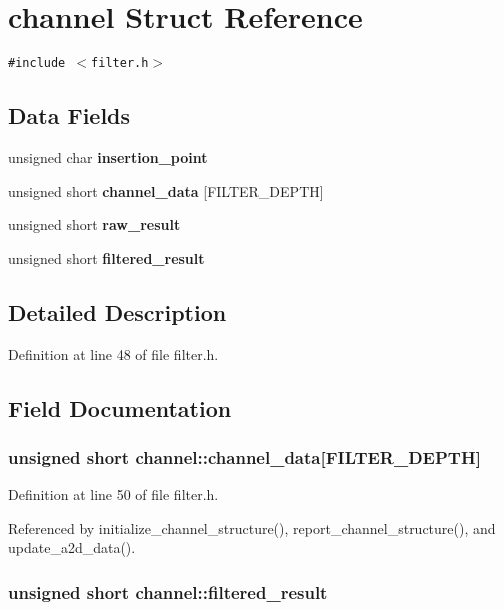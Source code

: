 \section{channel Struct Reference}
\label{structchannel}
{\tt \#include $<$filter.h$>$}

\subsection*{Data Fields}
\begin{CompactItemize}
\item 
unsigned char {\bf insertion\_\-point}
\item 
unsigned short {\bf channel\_\-data} [FILTER\_\-DEPTH]
\item 
unsigned short {\bf raw\_\-result}
\item 
unsigned short {\bf filtered\_\-result}
\end{CompactItemize}


\subsection{Detailed Description}




Definition at line 48 of file filter.h.

\subsection{Field Documentation}
\subsubsection{\setlength{\rightskip}{0pt plus 5cm}unsigned short {\bf channel::channel\_\-data}[FILTER\_\-DEPTH]}\label{structchannel_o1}




Definition at line 50 of file filter.h.

Referenced by initialize\_\-channel\_\-structure(), report\_\-channel\_\-structure(), and update\_\-a2d\_\-data().
\subsubsection{\setlength{\rightskip}{0pt plus 5cm}unsigned short {\bf channel::filtered\_\-result}}\label{structchannel_o3}




